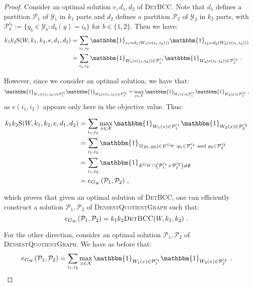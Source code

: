 \begin{proof}
 Consider an optimal solution $e,d_1,d_2$ of \textsc{DetBCC}. Note that $d_1$ defines a partition $\mathcal{P}_1$ of $\mathcal{Y}_1$ in $k_1$ parts and $d_2$ defines a partition $\mathcal{P}_2$ of $\mathcal{Y}_2$ in $k_2$ parts, with $\mathcal{P}_b^{i_b} := \{y_b \in \mathcal{Y}_b : d_b(y) = i_b \}$ for $b \in \{1,2\}$. Then we have:
\begin{equation}
  \begin{aligned}
    k_1k_2\mathrm{S}(W,k_1,k_2,e,d_1,d_2) &= \sum_{i_1,i_2} \mathbbm{1}_{i_1=d_1(W_1(e(i_1,i_2)))}\mathbbm{1}_{i_2=d_2(W_2(e(i_1,i_2)))}\\
    &= \sum_{i_1,i_2} \mathbbm{1}_{W_1(e(i_1,i_2)) \in \mathcal{P}_1^{i_1}}\mathbbm{1}_{W_2(e(i_1,i_2)) \in \mathcal{P}_2^{i_2}} \ .
    \end{aligned}
\end{equation}

However, since we consider an optimal solution, we have that:
\[ \mathbbm{1}_{W_1(e(i_1,i_2)) \in \mathcal{P}_1^{i_1}}\mathbbm{1}_{W_2(e(i_1,i_2)) \in \mathcal{P}_2^{i_2}} = \max_{x \in \mathcal{X}}\mathbbm{1}_{W_1(x) \in \mathcal{P}_1^{i_1}}\mathbbm{1}_{W_2(x) \in \mathcal{P}_2^{i_2}} \ , \]
as $e(i_1,i_2)$ appears only here in the objective value. Thus:

\begin{equation}
  \begin{aligned}   
    k_1k_2\mathrm{S}(W,k_1,k_2,e,d_1,d_2) &=  \sum_{i_1,i_2} \max_{x \in \mathcal{X}}\mathbbm{1}_{W_1(x) \in \mathcal{P}_1^{i_1}}\mathbbm{1}_{W_2(x) \in \mathcal{P}_2^{i_2}}\\
    &= \sum_{i_1,i_2} \mathbbm{1}_{\exists (y_1,y_2) \in E^{G_W}: y_1 \in \mathcal{P}_1^{i_1}\text{ and } y_2 \in \mathcal{P}_2^{i_2}}\\
    &= \sum_{i_1,i_2} \mathbbm{1}_{E^{G_W} \cap \left(\mathcal{P}_1^{i_1} \times \mathcal{P}_2^{i_2}\right) \not= \emptyset}\\
    &=  e_{G_W}(\mathcal{P}_1,\mathcal{P}_2) \ ,\\
    \end{aligned}
\end{equation}

which proves that given an optimal solution of \textsc{DetBCC}, one can efficiently construct a solution $\mathcal{P}_1,\mathcal{P}_2$ of \textsc{DensestQuotientGraph} such that:
\[ e_{G_W}(\mathcal{P}_1,\mathcal{P}_2) =  k_1k_2\textsc{DetBCC}(W,k_1,k_2) \ . \]

For the other direction, consider an optimal solution $\mathcal{P}_1,\mathcal{P}_2$ of \textsc{DensestQuotientGraph}. We have as before that:
\[ e_{G_W}(\mathcal{P}_1,\mathcal{P}_2) =  \sum_{i_1,i_2} \max_{x \in \mathcal{X}}\mathbbm{1}_{W_1(x) \in \mathcal{P}_1^{i_1}}\mathbbm{1}_{W_2(x) \in \mathcal{P}_2^{i_2}} \ . \]


\end{proof}
